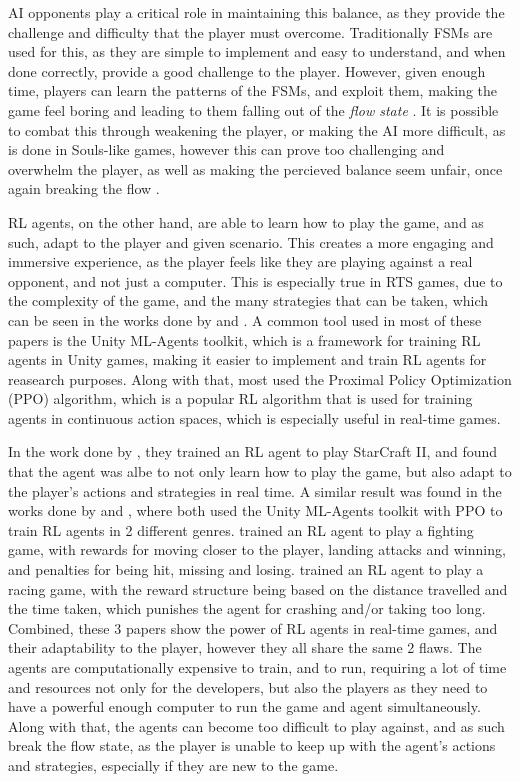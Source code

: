 \documentclass[conference]{IEEEtran}
\begin{document}
AI opponents play a critical role in maintaining this balance, as they provide the challenge and difficulty that the player must overcome. Traditionally FSMs are used for this, as they are simple to implement
and easy to understand, and when done correctly, provide a good challenge to the player. However, given enough time, players can learn the patterns of the FSMs, and exploit them,
making the game feel boring and leading to them falling out of the \textit{flow state} \cite{noauthor_comparative_nodate}. It is possible to combat this through weakening the player, or making the AI more difficult,
as is done in Souls-like games, however this can prove too challenging and overwhelm the player, as well as making the percieved balance seem unfair, once again breaking the flow \cite{jagdale_finite_2021} \cite{noauthor_finite_2020}.

RL agents, on the other hand, are able to learn how to play the game, and as such, adapt to the player and given scenario. This creates a more engaging
and immersive experience, as the player feels like they are playing against a real opponent, and not just a computer. This is especially true in RTS games,
due to the complexity of the game, and the many strategies that can be taken, which can be seen in the works done by \cite{vinyals_grandmaster_2019} and \cite{grech_creating_2023}.
A common tool used in most of these papers is the Unity ML-Agents toolkit, which is a framework for training RL agents in Unity games, making it easier to implement and train RL agents for reasearch purposes.
Along with that, most used the Proximal Policy Optimization (PPO) algorithm, which is a popular RL algorithm that is used for training agents in continuous action spaces, which is especially useful in real-time games.

In the work done by \cite{vinyals_grandmaster_2019}, they trained an RL agent to play StarCraft II, and found that the agent was albe to not only learn how to play the game, but also adapt to the player's actions and strategies in real time.
A similar result was found in the works done by \cite{bin_ramlan_implementation_2021} and \cite{raut_unity_2024}, where both used the Unity ML-Agents toolkit with PPO to train RL agents in 2 different genres.
\cite{bin_ramlan_implementation_2021} trained an RL agent to play a fighting game, with rewards for moving closer to the player, landing attacks and winning, and penalties for being hit, missing and losing.
\cite{raut_unity_2024} trained an RL agent to play a racing game, with the reward structure being based on the distance travelled and the time taken, which punishes the agent for crashing and/or taking too long.
Combined, these 3 papers show the power of RL agents in real-time games, and their adaptability to the player, however they all share the same 2 flaws. The agents are computationally expensive to train, and to
run, requiring a lot of time and resources not only for the developers, but also the players as they need to have a powerful enough computer to run the game and agent simultaneously. Along with that, the agents
can become too difficult to play against, and as such break the flow state, as the player is unable to keep up with the agent's actions and strategies, especially if they are new to the game.
\end{document}
